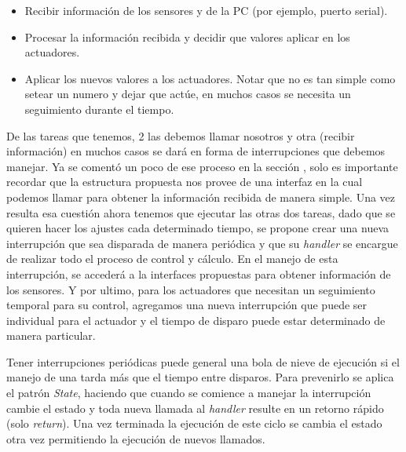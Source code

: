\begin{itemize}
    \item Recibir información de los sensores y de la PC (por ejemplo, puerto serial).
    \item Procesar la información recibida y decidir que valores aplicar en los actuadores.
    \item Aplicar los nuevos valores a los actuadores. Notar que no es tan simple como setear un numero y dejar que actúe, en muchos casos se necesita un seguimiento durante el tiempo.
\end{itemize}

De las tareas que tenemos, 2 las debemos llamar nosotros y otra (recibir información) en muchos casos se dará en forma de interrupciones que debemos manejar. Ya se comentó un poco de ese proceso en la sección , solo es importante recordar que la estructura propuesta nos provee de una interfaz en la cual podemos llamar para obtener la información recibida de manera simple. Una vez resulta esa cuestión ahora tenemos que ejecutar las otras dos tareas, dado que se quieren hacer los ajustes cada determinado tiempo, se propone crear una nueva interrupción que sea disparada de manera periódica y que su \textit{handler} se encargue de realizar todo el proceso de control y cálculo. En el manejo de esta interrupción, se accederá a la interfaces propuestas para obtener información de los sensores. Y por ultimo, para los actuadores que necesitan un seguimiento temporal para su control, agregamos una nueva interrupción que puede ser individual para el actuador y el tiempo de disparo puede estar determinado de manera particular.

Tener interrupciones periódicas puede general una bola de nieve de ejecución si el manejo de una tarda más que el tiempo entre disparos. Para prevenirlo se aplica el patrón \textit{State}, haciendo que cuando se comience a manejar la interrupción cambie el estado y toda nueva llamada al \textit{handler} resulte en un retorno rápido (solo \textit{return}). Una vez terminada la ejecución de este ciclo se cambia el estado otra vez permitiendo la ejecución de nuevos llamados.

